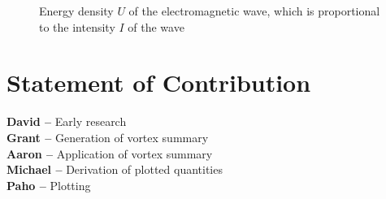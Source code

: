 \documentclass[10pt]{article}
\begin{document}
\begin{figure}[h]
\centering
\caption{Energy density $U$ of the electromagnetic wave, which is proportional to the intensity $I$ of the wave}
\label{g:F}
\end{figure}



\section*{Statement of Contribution}
\textbf{David --} Early research \\
\textbf{Grant --} Generation of vortex summary \\
\textbf{Aaron --} Application of vortex summary \\
\textbf{Michael --} Derivation of plotted quantities \\
\textbf{Paho --} Plotting\\

 

\end{document}
